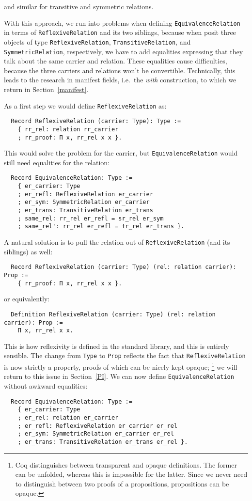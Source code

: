 \documentclass[a4paper,10pt,runningheads]{llncs}
\begin{document}
and similar for transitive and symmetric relations.

With this approach, we run into problems when defining \lstinline|EquivalenceRelation| in terms of
\lstinline|ReflexiveRelation| and its two siblings, because when posit three objects of type
\lstinline|ReflexiveRelation|, \lstinline|TransitiveRelation|, and \lstinline|SymmetricRelation|, respectively, we have to
add equalities expressing that they talk about the same carrier and relation. These equalities
cause difficulties, because the three carriers and relations won't be convertible.
Technically, this leads to the research in manifest fields, i.e.\ the \emph{with} construction, to
which we return in Section~\ref{manifest}.

As a first step we would define \lstinline|ReflexiveRelation| as:
\begin{lstlisting}
  Record ReflexiveRelation (carrier: Type): Type :=
    { rr_rel: relation rr_carrier
    ; rr_proof: Π x, rr_rel x x }.
\end{lstlisting}

This would solve the problem for the carrier, but \lstinline|EquivalenceRelation| would still need equalities for the relation:
\begin{lstlisting}
  Record EquivalenceRelation: Type :=
    { er_carrier: Type
    ; er_refl: ReflexiveRelation er_carrier
    ; er_sym: SymmetricRelation er_carrier
    ; er_trans: TransitiveRelation er_trans
    ; same_rel: rr_rel er_refl = sr_rel er_sym
    ; same_rel': rr_rel er_refl = tr_rel er_trans }.
\end{lstlisting}


A natural solution is to pull the relation out of \lstinline|ReflexiveRelation| (and its siblings) as well:
\begin{lstlisting}
  Record ReflexiveRelation (carrier: Type) (rel: relation carrier): Prop :=
    { rr_proof: Π x, rr_rel x x }.
\end{lstlisting}

or equivalently:
\begin{lstlisting}
  Definition ReflexiveRelation (carrier: Type) (rel: relation carrier): Prop :=
    Π x, rr_rel x x.
\end{lstlisting}

This is how reflexivity is defined in the standard library, and this is entirely sensible. The
change from \lstinline|Type| to \lstinline|Prop| reflects the fact that \lstinline|ReflexiveRelation| is now strictly a property,
proofs of which can be nicely kept opaque;%
\footnote{Coq distinguishes between transparent and opaque definitions. The former can be unfolded,
whereas this is impossible for the latter. Since we never need to distinguish between two proofs of
a propositions, propositions can be opaque.}
we will return to this issue in Section~\ref{PI}.
We can now define \lstinline|EquivalenceRelation| without awkward equalities:
\begin{lstlisting}
  Record EquivalenceRelation: Type :=
    { er_carrier: Type
    ; er_rel: relation er_carrier
    ; er_refl: ReflexiveRelation er_carrier er_rel
    ; er_sym: SymmetricRelation er_carrier er_rel
    ; er_trans: TransitiveRelation er_trans er_rel }.
\end{lstlisting}
\end{document}
